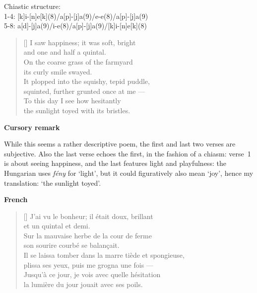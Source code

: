 \documentclass[a4paper,12pt,twoside,final]{book}
\begin{document}
\noindent Chiastic structure: \\
1-4: [k]i-[n]e[k](8)/a[p]-[j]a(9)/e-e(8)/a[p]-[j]a(9)\\
5-8: a[d]-[j]a(9)/i-e(8)/a[p]-[j]a(9)/[k]i-[n]e[k](8)

\newpage


\settowidth{\versewidth}{It plopped into the squishy, tepid puddle,}

\begin{verse}[\versewidth]
  I saw happiness; it was soft, bright \\
  and one and half a quintal. \\
  On the coarse grass of the farmyard \\
  its curly smile swayed. \\
  It plopped into the squishy, tepid puddle, \\
  squinted, further grunted once at me --- \\
  To this day I see how hesitantly \\
  the sunlight toyed with its bristles. \\
\end{verse}

\bigskip

\noindent \textbf{Cursory remark}

\medskip

While this seems a rather descriptive poem, the first and last two
verses are subjective. Also the last verse echoes the first, in the
fashion of a chiasm: verse~1 is about seeing happiness, and the last
features light and playfulness: the Hungarian uses \emph{fény} for
`light', but it could figuratively also mean `joy', hence my
translation: `the sunlight toyed'.

\bigskip

\noindent \textbf{French}


\settowidth{\versewidth}{Il se laissa tomber dans la marre tiède et spongieuse,}

\begin{verse}[\versewidth]
  J'ai vu le bonheur; il était doux, brillant \\
  et un quintal et demi. \\
  Sur la mauvaise herbe de la cour de ferme \\
  son sourire courbé se balançait. \\
  Il se laissa tomber dans la marre tiède et spongieuse, \\
  plissa ses yeux, puis me grogna une fois --- \\
  Jusqu'à ce jour, je vois avec quelle hésitation \\
  la lumière du jour jouait avec ses poils. \\
\end{verse}
\end{document}
